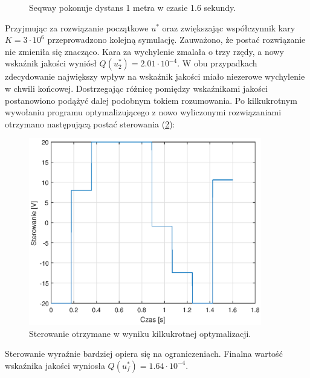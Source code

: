 \begin{figure}[H]
	\caption{Seqway pokonuje dystans 1 metra w czasie 1.6 sekundy.}
	\label{fig:equ1}
\end{figure}
Przyjmując za rozwiązanie początkowe $u^*$ oraz zwiększając współczynnik kary $K=3\cdot10^6$ przeprowadzono kolejną symulację. Zauważono, że postać rozwiązanie nie zmieniła się znacząco. Kara za wychylenie zmalała o trzy rzędy, a nowy wskaźnik jakości wyniósł    $Q(u_2^*)=2.01\cdot10^{-4}$. W obu przypadkach zdecydowanie największy wpływ na wskaźnik jakości miało niezerowe wychylenie w chwili końcowej. Dostrzegając różnicę pomiędzy wskaźnikami jakości postanowiono podążyć dalej podobnym tokiem rozumowania. Po kilkukrotnym wywołaniu programu optymalizującego z nowo wyliczonymi rozwiązaniami otrzymano następującą postać sterowania (\ref{fig:ctrNew}):
\begin{figure}[H]
	\centering
	\includegraphics[width=4in]{Figures/exp1/controlNew.eps}
	\caption{Sterowanie otrzymane w wyniku kilkukrotnej optymalizacji.}
	\label{fig:ctrNew}
\end{figure}
Sterowanie wyraźnie bardziej opiera się na ograniczeniach. Finalna wartość wskaźnika jakości wyniosła $Q(u_f^*)=1.64\cdot10^{-4}$.